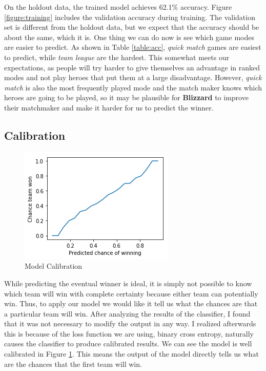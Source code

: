 \documentclass[twoside,twocolumn]{article}
\begin{document}
On the holdout data, the trained model achieves 62.1\% accuracy.  Figure \ref{figure:training} includes the validation accuracy during training.  The validation set is different from the holdout data, but we expect that the accuracy should be about the same, which it is.  One thing we can do now is see which game modes are easier to predict.  As shown in Table \ref{table:acc}, \textit{quick match} games are easiest to predict, while \textit{team league} are the hardest.  This somewhat meets our expectations, as people will try harder to give themselves an advantage in ranked modes and not play heroes that put them at a large disadvantage.  However, \textit{quick match} is also the most frequently played mode and the match maker knows which heroes are going to be played, so it may be plausible for \textbf{Blizzard} to improve their matchmaker and make it harder for us to predict the winner.

\subsection{Calibration}

\begin{figure}[h]
\caption{Model Calibration}
\label{figure:calib}
\centering
\includegraphics[width=\linewidth]{calibration}
\end{figure}

While predicting the eventual winner is ideal, it is simply not possible to know which team will win with complete certainty because either team can potentially win.  Thus, to apply our model we would like it tell us what the chances are that a particular team will win.  After analyzing the results of the classifier, I found that it was not necessary to modify the output in any way.  I realized afterwards this is because of the loss function we are using, binary cross entropy, naturally causes the classifier to produce calibrated results.  We can see the model is well calibrated in Figure \ref{figure:calib}.  This means the output of the model directly tells us what are the chances that the first team will win.
\end{document}
